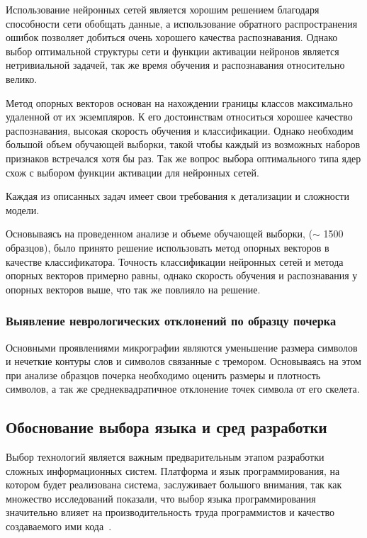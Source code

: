 Использование нейронных сетей является хорошим решением благодаря способности сети обобщать данные, а использование обратного распространения ошибок позволяет добиться очень хорошего качества распознавания. Однако выбор оптимальной структуры сети и функции активации нейронов является нетривиальной задачей, так же время обучения и распознавания относительно велико.

Метод опорных векторов основан на нахождении границы классов максимально удаленной от их экземпляров. К его достоинствам относиться хорошее качество распознавания, высокая скорость обучения и классификации. Однако необходим большой объем обучающей выборки, такой чтобы каждый из возможных наборов признаков встречался хотя бы раз. Так же вопрос выбора оптимального типа ядер схож с выбором функции активации для нейронных сетей.

Каждая из описанных задач имеет свои требования к детализации и сложности модели.

Основываясь на проведенном анализе и объеме обучающей выборки, ($\sim$ 1500 образцов), было принято решение использовать метод опорных векторов в качестве классификатора. Точность классификации нейронных сетей и метода опорных векторов примерно равны, однако скорость обучения и распознавания у опорных векторов выше, что так же повлияло на решение.

\subsubsection{Выявление неврологических отклонений по образцу почерка}
Основными проявлениями микрографии являются уменьшение размера символов и нечеткие контуры слов и символов связанные с тремором. Основываясь на этом при анализе образцов почерка необходимо оценить размеры и плотность символов, а так же среднеквадратичное отклонение точек символа от его скелета.

\subsection{Обоснование выбора языка и сред разработки}
\label{sec:techs:intro}
Выбор технологий является важным предварительным этапом разработки сложных информационных систем. Платформа и язык программирования, на котором будет реализована система, заслуживает большого внимания, так как множество исследований показали, что выбор языка программирования значительно влияет на производительность труда программистов и качество создаваемого ими кода~\cite[c.~59]{mcconnell_2005}.

